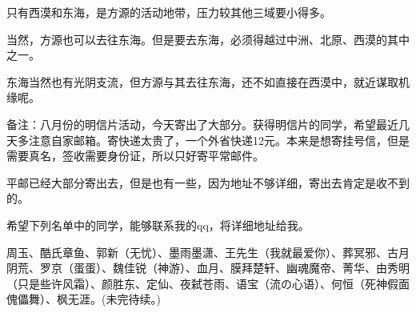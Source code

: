 \begin{this_body}
只有西漠和东海，是方源的活动地带，压力较其他三域要小得多。

当然，方源也可以去往东海。但是要去东海，必须得越过中洲、北原、西漠的其中之一。

东海当然也有光阴支流，但方源与其去往东海，还不如直接在西漠中，就近谋取机缘呢。

备注：八月份的明信片活动，今天寄出了大部分。获得明信片的同学，希望最近几天多注意自家邮箱。寄快递太贵了，一个外省快递12元。本来是想寄挂号信，但是需要真名，签收需要身份证，所以只好寄平常邮件。

平邮已经大部分寄出去，但是也有一些，因为地址不够详细，寄出去肯定是收不到的。

希望下列名单中的同学，能够联系我的qq，将详细地址给我。

周玉、酷氏章鱼、郭新（无忧）、墨雨墨潇、王先生（我就最爱你）、葬冥邪、古月阴荒、罗京（蛋蛋）、魏佳锐（神游）、血月、膜拜楚轩、幽魂魔帝、菁华、由秀明（只是些许风霜）、颜胜东、定仙、夜弑苍雨、语宝（流の心语）、何恒（死神假面傀儡舞）、枫无涯。(未完待续。)

\end{this_body}

